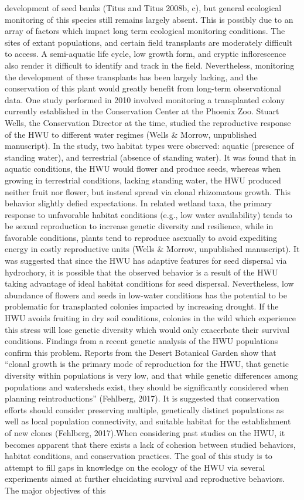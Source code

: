 \documentclass[twocolumn]{article}
\begin{document}
development of seed banks (Titus and Titus 2008b, c), but general ecological monitoring of this species still remains largely absent. This is possibly due to an array of factors which impact long term ecological monitoring conditions. The sites of extant populations, and certain field transplants are moderately difficult to access. A semi-aquatic life cycle, low growth form, and cryptic inflorescence also render it difficult to identify and track in the field. Nevertheless, monitoring the development of these transplants has been largely lacking, and the conservation of this plant would greatly benefit from long-term observational data. One study performed in 2010 involved monitoring a transplanted colony currently established in the Conservation Center at the Phoenix Zoo. Stuart Wells, the Conservation Director at the time, studied the reproductive response of the HWU to different water regimes (Wells & Morrow, unpublished manuscript). In the study, two habitat types were observed: aquatic (presence of standing water), and terrestrial (absence of standing water). It was found that in aquatic conditions, the HWU would flower and produce seeds, whereas when growing in terrestrial conditions, lacking standing water, the HWU produced neither fruit nor flower, but instead spread via clonal rhizomatous growth. This behavior slightly defied expectations. In related wetland taxa, the primary response to unfavorable habitat conditions (e.g., low water availability) tends to be sexual reproduction to increase genetic diversity and resilience, while in favorable conditions, plants tend to reproduce asexually to avoid expediting energy in costly reproductive units (Wells & Morrow, unpublished manuscript). It was suggested that since the HWU has adaptive features for seed dispersal via hydrochory, it is possible that the observed behavior is a result of the HWU taking advantage of ideal habitat conditions for seed dispersal. Nevertheless, low abundance of flowers and seeds in low-water conditions has the potential to be problematic for transplanted colonies impacted by increasing drought. If the HWU avoids fruiting in dry soil conditions, colonies in the wild which experience this stress will lose genetic diversity which would only exacerbate their survival conditions. Findings from a recent genetic analysis of the HWU populations confirm this problem. Reports from the Desert Botanical Garden show that “clonal growth is the primary mode of reproduction for the HWU, that genetic diversity within populations is very low, and that while genetic differences among populations and watersheds exist, they should be significantly considered when planning reintroductions” (Fehlberg, 2017). It is suggested that conservation efforts should consider preserving multiple, genetically distinct populations as well as local population connectivity, and suitable habitat for the establishment of new clones (Fehlberg, 2017).When considering past studies on the HWU, it becomes apparent that there exists a lack of cohesion between studied behaviors, habitat conditions, and conservation practices. The goal of this study is to attempt to fill gaps in knowledge on the ecology of the HWU via several experiments aimed at further elucidating survival and reproductive behaviors. The major objectives of this 
\end{document}

